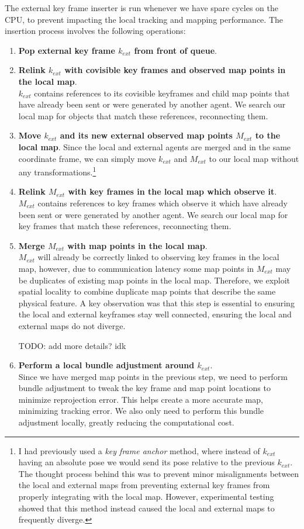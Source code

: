 The external key frame inserter is run whenever we have spare cycles on the CPU, to prevent impacting the local tracking and mapping performance. The insertion process involves the following operations:

\begin{enumerate}
    \item \textbf{Pop external key frame $k_{ext}$ from front of queue}.
    \item \textbf{Relink $k_{ext}$ with covisible key frames and observed map points in the local map}. \\
          $k_{ext}$ contains references to its covisible keyframes and child map points that have already been sent or were generated by another agent. We search our local map for objects that match these references, reconnecting them.
    \item \textbf{Move $k_{ext}$ and its new external observed map points $M_{ext}$ to the local map}.
          Since the local and external agents are merged and in the same coordinate frame, we can simply move $k_{ext}$ and $M_{ext}$ to our local map without any transformations.\footnote[1]{I had previously used a \textit{key frame anchor} method, where instead of $k_{ext}$ having an absolute pose we would send its pose relative to the previous $k_{ext}$. The thought process behind this was to prevent minor misalignments between the local and external maps from preventing external key frames from properly integrating with the local map. However, experimental testing showed that this method instead caused the local and external maps to frequently diverge.}
    \item \textbf{Relink $M_{ext}$ with key frames in the local map which observe it}. \\
          $M_{ext}$ contains references to key frames which observe it which have already been sent or were generated by another agent. We search our local map for key frames that match these references, reconnecting them.
    \item \textbf{Merge $M_{ext}$ with map points in the local map}. \\
          $M_{ext}$ will already be correctly linked to observing key frames in the local map, however, due to communication latency some map points in $M_{ext}$ may be duplicates of existing map points in the local map. Therefore, we exploit spatial locality to combine duplicate map points that describe the same physical feature. A key observation was that this step is essential to ensuring the local and external keyframes stay well connected, ensuring the local and external maps do not diverge.

          TODO: add more details? idk
    \item \textbf{Perform a local bundle adjustment around $k_{ext}$}. \\
          Since we have merged map points in the previous step, we need to perform bundle adjustment to tweak the key frame and map point locations to minimize reprojection error. This helps create a more accurate map, minimizing tracking error. We also only need to perform this bundle adjustment locally, greatly reducing the computational cost.
\end{enumerate}

